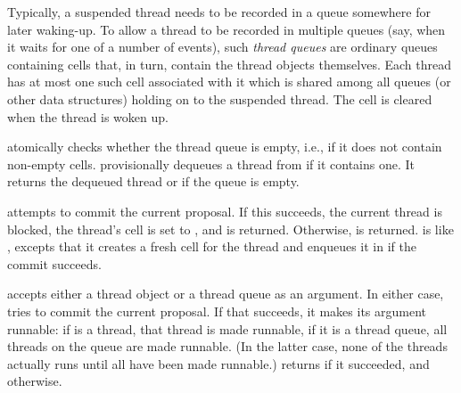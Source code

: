 Typically, a suspended thread needs to be recorded in a queue
somewhere for later waking-up.  To allow a thread to be recorded in
multiple queues (say, when it waits for one of a number of events),
such \textit{thread queues} are ordinary queues containing cells that,
in turn, contain the thread objects themselves.  Each thread has at
most one such cell associated with it which is shared among all queues
(or other data structures) holding on to the suspended thread.  The
cell is cleared when the thread is woken up.
%
\begin{protos}
\end{protos}
%
 atomically checks whether the
 thread queue is empty, i.e., if it does not
contain non-empty cells.   provisionally
dequeues a thread from  if it contains one.  It
returns the dequeued thread or  if the queue is empty.
%
\begin{protos}
\end{protos}
%
 attempts to commit the current proposal.
If this succeeds, the current thread is blocked, the thread's cell is
set to , and  is returned.  Otherwise, 
is returned.   is like
, excepts that it creates a fresh cell
for the thread and enqueues it in  if the commit
succeeds.

 accepts either a thread object or a
thread queue as an argument.  In either case,
 tries to commit the current
proposal.  If that succeeds, it 
makes its argument runnable: if  is a thread,
that thread is made runnable, if it is a thread queue, all threads on
the queue are made runnable.  (In the latter case, none of the threads
actually runs until all have been made runnable.)
 returns  if it succeeded,
and  otherwise.


